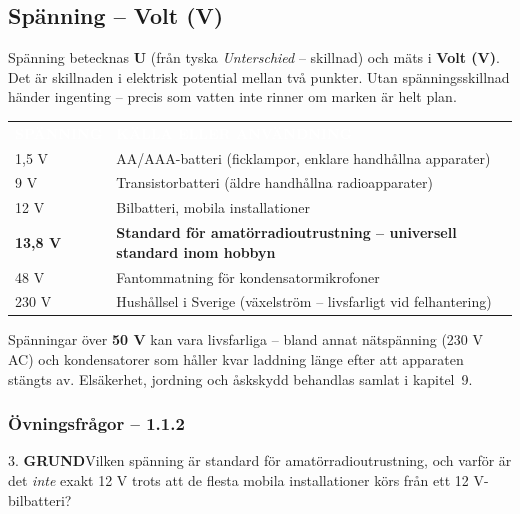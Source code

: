 \documentclass[a4paper,11pt,twoside]{book}
\newcommand{\emoji}[1]{{\emojifont #1}}
\newcommand{\tblhdr}[1]{\cellcolor{greydark}\textcolor{white}{\headingfont\bfseries\footnotesize\MakeUppercase{#1}}}
\newcommand{\qgrund}{\colorbox{greenpale}{\textcolor{greendark}{\headingfont\bfseries\tiny GRUND}}}
\begin{document}
\subsection{Spänning – Volt (V)}

Spänning betecknas \textbf{U} (från tyska \emph{Unterschied} – skillnad) och mäts i \textbf{Volt (V)}. Det är skillnaden i elektrisk potential mellan två punkter. Utan spänningsskillnad händer ingenting – precis som vatten inte rinner om marken är helt plan.

\begin{center}
\begin{tabular}{ll}
\rowcolor{greydark}
\tblhdr{Spänning} & \tblhdr{Källa eller användning} \\
1,5 V & AA/AAA-batteri (ficklampor, enklare handhållna apparater) \\
\rowcolor{greylight}
9 V & Transistorbatteri (äldre handhållna radioapparater) \\
12 V & Bilbatteri, mobila installationer \\
\rowcolor{greylight}
\textbf{13,8 V} & \textbf{Standard för amatörradioutrustning – universell standard inom hobbyn} \\
48 V & Fantommatning för kondensatormikrofoner \\
\rowcolor{greylight}
230 V & Hushållsel i Sverige (växelström – livsfarligt vid felhantering) \\
\end{tabular}
\end{center}

\begin{redbox}[title={\emoji{⚠️} Elsäkerhet}]
Spänningar över \textbf{50 V} kan vara livsfarliga – bland annat nätspänning (230 V AC) och kondensatorer som håller kvar laddning länge efter att apparaten stängts av. Elsäkerhet, jordning och åskskydd behandlas samlat i kapitel~9.
\end{redbox}

\subsubsection*{Övningsfrågor – 1.1.2}

\begin{qblock}{3.}
\qgrund\quad Vilken spänning är standard för amatörradioutrustning, och varför är det \emph{inte} exakt 12 V trots att de flesta mobila installationer körs från ett 12 V-bilbatteri?
\end{qblock}
\end{document}
